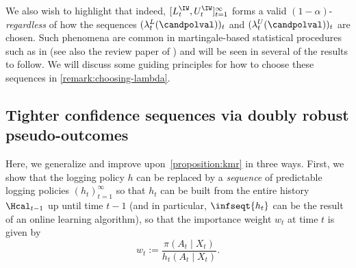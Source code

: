 We also wish to highlight that indeed, $[L_t^\IW, U_t^\IW]_{t=1}^\infty$ forms a valid $(1-\alpha)$-\cs{} \emph{regardless} of how the sequences $(\lambda_t^L(\candpolval))_t$ and $(\lambda_t^U(\candpolval))_t$ are chosen. Such phenomena are common in martingale-based statistical procedures such as in \citet{waudby2020estimating} (see also the review paper of \citet{ramdas2022game}) and will be seen in several of the results to follow. We will discuss some guiding principles for how to choose these sequences in \cref{remark:choosing-lambda}.

\subsection{Tighter confidence sequences via doubly robust pseudo-outcomes}\label{section:dr}

Here, we generalize and improve upon~\cref{proposition:kmr} in three ways. First, we show that the logging policy $h$ can be replaced by a \emph{sequence} of predictable logging policies $(h_t)_{t=1}^\infty$ so that $h_t$ can be built from the entire history $\Hcal_{t-1}$ up until time $t-1$ (and in particular, $\infseqt{h_t}$ can be the result of an online learning algorithm), so that the importance weight $w_t$ at time $t$ is given by
\begin{equation}\label{eq:predictable-importance-weights}
  w_t := \frac{\pi(A_t \mid X_t)}{h_t(A_t \mid X_t)}.
\end{equation}

